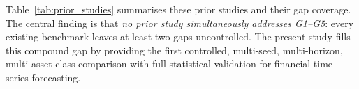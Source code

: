 Table~\ref{tab:prior_studies} summarises these prior studies and their gap coverage.  The central finding is that \emph{no prior study simultaneously addresses G1--G5}: every existing benchmark leaves at least two gaps uncontrolled.  The present study fills this compound gap by providing the first controlled, multi-seed, multi-horizon, multi-asset-class comparison with full statistical validation for financial time-series forecasting.


